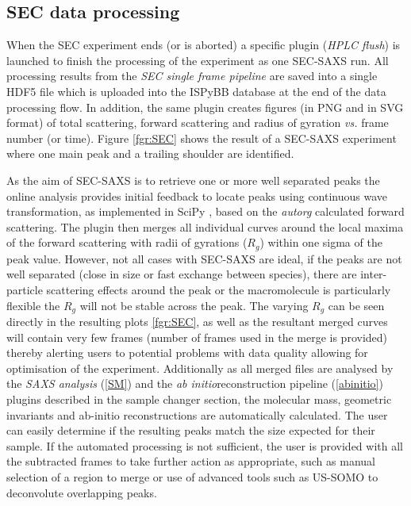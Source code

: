 \documentclass[preprint,pdf]{iucr}              %
\begin{document}
\subsection{SEC data processing}
When the SEC experiment ends (or is aborted) a specific plugin (\textit{HPLC flush}) is launched to finish the processing of the experiment as one SEC-SAXS run.
All processing results from the \textit{SEC single frame pipeline} are saved into a single HDF5 file which is uploaded into the ISPyBB database at the end of the data processing flow.
In addition, the same plugin creates figures (in PNG and in SVG format) of  total scattering, forward scattering and radius of gyration \textit{vs.} frame number (or time).
Figure \ref{fgr:SEC} shows the result of a SEC-SAXS experiment where one main peak and a trailing shoulder are identified.

As the aim of SEC-SAXS is to retrieve one or more well separated peaks the online analysis provides initial feedback to locate peaks using continuous wave transformation, as implemented in SciPy \cite{cwt,scipy}, based on the \textit{autorg} calculated forward scattering. 
The plugin then merges all individual curves around the local maxima of the forward scattering with radii of gyrations ($R_g$) within one sigma of the peak value. 
However, not all cases with SEC-SAXS are ideal, if the peaks are not well separated (close in size or fast exchange between species), there are inter-particle scattering effects around the peak or the macromolecule is particularly flexible the $R_{g}$ will not be stable across the peak. 
The varying $R_{g}$ can be seen directly in the resulting plots \ref{fgr:SEC}, as well as the resultant merged curves will contain very few frames (number of frames used in the merge is provided) thereby alerting users to potential problems with data quality allowing for optimisation of the experiment. 
Additionally as all merged files are analysed by the \textit{SAXS analysis} (\ref{SM}) and the \textit{ab initio}reconstruction pipeline (\ref{abinitio}) plugins described in the sample changer section, the molecular mass, geometric invariants and ab-initio reconstructions are automatically calculated. 
The user can easily determine if the resulting peaks match the size expected for their sample. 
If the automated processing is not sufficient, the user is provided with all the subtracted frames to take further action as appropriate, such as  manual selection of a region to merge or use of advanced tools such as US-SOMO \cite{USSOMO} to deconvolute overlapping peaks.
\end{document}
